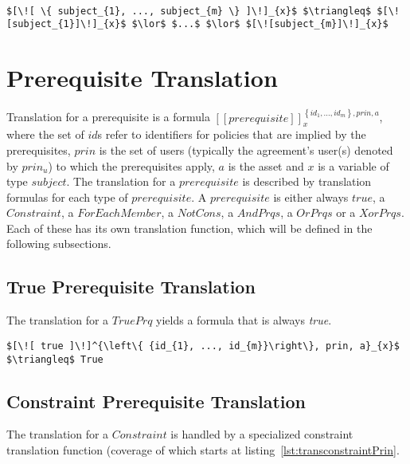 \lstset{mathescape, language=AST}  
\begin{lstlisting}[frame=single, caption={Prin Translation {$\colon$} List of subjects},label={lst:transprinListOfSubjects}]

$[\![ \{ subject_{1}, ..., subject_{m} \} ]\!]_{x}$ $\triangleq$ $[\![subject_{1}]\!]_{x}$ $\lor$ $...$ $\lor$ $[\![subject_{m}]\!]_{x}$

\end{lstlisting}




\section{Prerequisite Translation}

Translation for a prerequisite is a formula $[\![prerequisite]\!]^{\left\{ {id_{1}, ..., id_{m}}\right\}, prin, a}_{x}$, where the set of $id$s refer to identifiers for policies that are implied by the prerequisites, $prin$ is the set of users (typically the agreement's user(s) denoted by $prin_{u}$) to which the prerequisites apply, $a$ is the asset and $x$ is a variable of type $subject$. The translation for a $prerequisite$ is described by translation formulas for each type of $prerequisite$. A $prerequisite$ is either always $true$, a $Constraint$, a $ForEachMember$, a $NotCons$, a $AndPrqs$, a $OrPrqs$ or a $XorPrqs$. Each of these has its own translation function, which will be defined in the following subsections.

\subsection{True Prerequisite Translation}
The translation for a $TruePrq$ yields a formula that is always \emph{true}.

\lstset{mathescape, language=AST}  
\begin{lstlisting}[frame=single, caption={Prerequisite Translation {$\colon$} Always True Prerequisite},label={lst:transpreRequisiteTruePrq}]
	$[\![ true ]\!]^{\left\{ {id_{1}, ..., id_{m}}\right\}, prin, a}_{x}$ $\triangleq$ True
\end{lstlisting}

\subsection{Constraint Prerequisite Translation}
The translation for a $Constraint$ is handled by a specialized constraint translation function (coverage of which starts at listing~\ref{lst:transconstraintPrin}.

